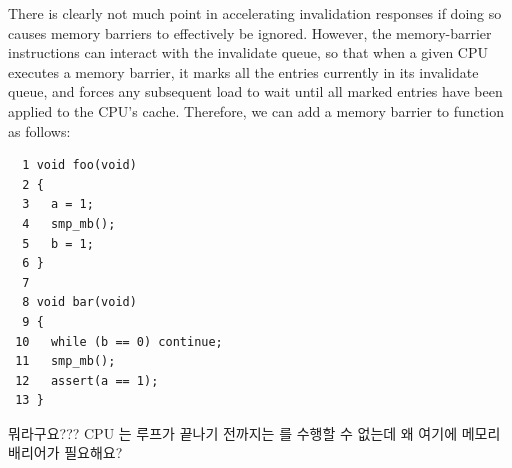 There is clearly not much point in accelerating invalidation responses
if doing so causes memory barriers to effectively be ignored.
However, the memory-barrier instructions can interact with
the invalidate queue, so that when a given CPU executes a memory
barrier, it marks all the entries currently in its invalidate queue,
and forces any subsequent load to wait until all marked entries
have been applied to the CPU's cache.
Therefore, we can add a memory barrier to function  as follows:
\fi

\vspace{5pt}
\begin{minipage}[t]{\columnwidth}
\small
\begin{verbatim}
  1 void foo(void)
  2 {
  3   a = 1;
  4   smp_mb();
  5   b = 1;
  6 }
  7
  8 void bar(void)
  9 {
 10   while (b == 0) continue;
 11   smp_mb();
 12   assert(a == 1);
 13 }
\end{verbatim}
\end{minipage}
\vspace{5pt}

\QuickQuiz{}
	뭐라구요???
	CPU 는  루프가 끝나기 전까지는  를 수행할 수
	없는데 왜 여기에 메모리 배리어가 필요해요?
	\iffalse


